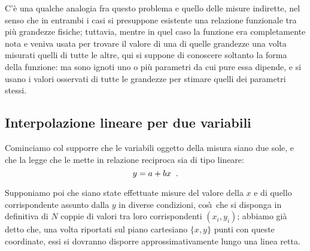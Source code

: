C'\`e una qualche analogia fra questo problema e quello
delle misure indirette, nel senso che in entrambi i casi si
presuppone esistente una relazione funzionale tra pi\`u
grandezze fisiche; tuttavia, mentre in quel caso la funzione
era completamente nota e veniva usata per trovare il valore
di una di quelle grandezze una volta misurati quelli di
tutte le altre, qui si suppone di conoscere soltanto la
forma della funzione: ma sono ignoti uno o pi\`u parametri
da cui pure essa dipende, e si usano i valori osservati di
tutte le grandezze per stimare quelli dei parametri stessi.

\subsection{Interpolazione lineare per due variabili}%
%
\label{ch:11.intlin}
Cominciamo col supporre che le variabili oggetto della
misura siano due sole, e che la legge che le mette in
relazione reciproca sia di tipo lineare:
\begin{equation*}
  y = a+bx \;\; .
\end{equation*}

Supponiamo poi che siano state effettuate misure del valore
della $x$ e di quello corrispondente assunto dalla $y$ in
diverse condizioni, cos\`\i\ che si disponga in definitiva
di $N$ coppie di valori tra loro corrispondenti $(x_i,
y_i)$; abbiamo gi\`a detto che, una volta riportati sul
piano cartesiano $\{ x, y \}$ punti con queste coordinate,
essi si dovranno disporre approssimativamente lungo una
linea retta.

